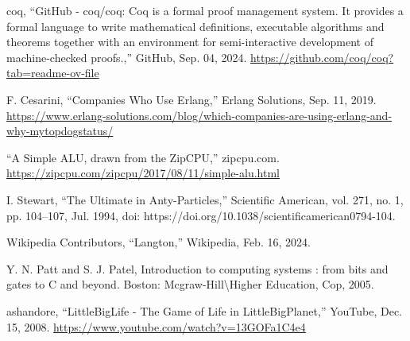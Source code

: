 \documentclass[12pt]{report} %
\begin{document}
\begin{singlespace}
\begin{thebibliography}{}
             coq, “GitHub - coq/coq: Coq is a formal proof management system. It provides a formal language to write mathematical definitions, executable algorithms and theorems together with an environment for semi-interactive development of machine-checked proofs.,” GitHub, Sep. 04, 2024. \href{https://github.com/coq/coq?tab=readme-ov-file}{https://github.com/coq/coq?tab=readme-ov-file}

             F. Cesarini, “Companies Who Use Erlang,” Erlang Solutions, Sep. 11, 2019. \href{https://www.erlang-solutions.com/blog/which-companies-are-using-erlang-and-why-mytopdogstatus/}{https://www.erlang-solutions.com/blog/which-companies-are-using-erlang-and-why-mytopdogstatus/}

             “A Simple ALU, drawn from the ZipCPU,” zipcpu.com. \href{https://zipcpu.com/zipcpu/2017/08/11/simple-alu.html}{https://zipcpu.com/zipcpu/2017/08/11/simple-alu.html}

             I. Stewart, “The Ultimate in Anty-Particles,” Scientific American, vol. 271, no. 1, pp. 104–107, Jul. 1994, doi: https://doi.org/10.1038/scientificamerican0794-104.

             Wikipedia Contributors, “Langton,” Wikipedia, Feb. 16, 2024.

             Y. N. Patt and S. J. Patel, Introduction to computing systems : from bits and gates to C and beyond. Boston: Mcgraw-Hill\textbackslash Higher Education, Cop, 2005.

             ashandore, “LittleBigLife - The Game of Life in LittleBigPlanet,” YouTube, Dec. 15, 2008. \href{https://www.youtube.com/watch?v=13GOFa1C4e4}{https://www.youtube.com/watch?v=13GOFa1C4e4}
            
        \end{thebibliography}

    \end{singlespace}

    \appendix
        
    
    
    

    

    
\end{document}
